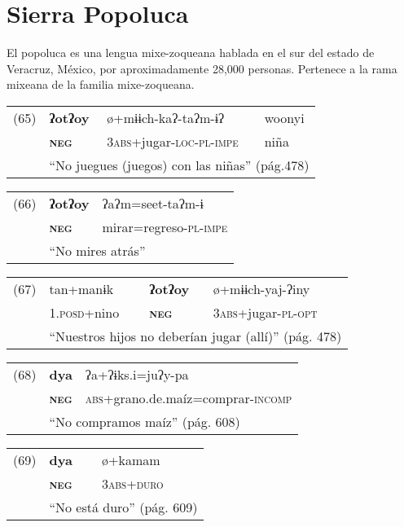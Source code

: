 \section*{Sierra Popoluca}

\noindent El popoluca es una lengua mixe-zoqueana hablada en el sur del estado de Veracruz, México, por aproximadamente 28,000 personas. Pertenece a la rama mixeana de la familia mixe-zoqueana. \vspace{0.5cm}

{\setmainfont{Charis SIL} 

\begin{tabular}{llll}
(65) & \textbf{ʔotʔoy} & ø+mɨɨch-kaʔ-taʔm-ɨʔ & woonyi \\
& \textsc{\textbf{neg}} & \textsc{3abs}+jugar-\textsc{loc-pl-impe} & niña \\
& \multicolumn{3}{l}{``No juegues (juegos) con las niñas'' (pág.478)}
\end{tabular} \vspace{0.5cm}

\begin{tabular}{lll}
(66) & \textbf{ʔotʔoy} & ʔaʔm=seet-taʔm-ɨ \\
& \textsc{\textbf{neg}} & mirar=regreso-\textsc{pl-impe} \\
& \multicolumn{2}{l}{``No mires atrás''}
\end{tabular} \vspace{0.5cm}

\begin{tabular}{llll}
(67) & tan+manɨk & \textbf{ʔotʔoy} & ø+mɨɨch-yaj-ʔiny \\
& 1.\textsc{posd+}nino & \textsc{\textbf{neg}} & \textsc{3abs+}jugar-\textsc{pl-opt} \\
& \multicolumn{3}{l}{``Nuestros hijos no deberían jugar (allí)'' (pág. 478)}
\end{tabular} \vspace{0.5cm}

\begin{tabular}{lll}
(68) & \textbf{dya} & ʔa+ʔɨks.i=juʔy-pa \\
& \textsc{\textbf{neg}} & \textsc{abs}+grano.de.maíz=comprar-\textsc{incomp} \\
& \multicolumn{2}{l}{``No compramos maíz'' (pág. 608)}
\end{tabular} \vspace{0.5cm}

\begin{tabular}{lll}
(69) &  \textbf{dya} & ø+kamam \\
& \textsc{\textbf{neg}} & \textsc{3abs+duro} \\
& \multicolumn{2}{l}{``No está duro'' (pág. 609)}
\end{tabular} \vspace{0.5cm}

}
